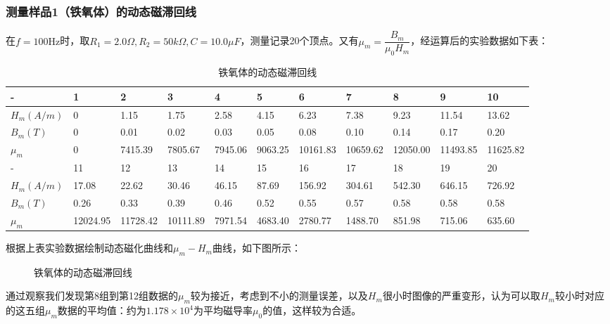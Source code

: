 \documentclass[11pt]{article}
\begin{document}
\subsubsection{测量样品1（铁氧体）的动态磁滞回线}

在$f=100\text{Hz}$时，取$R_1=2.0\Omega,R_2=50k\Omega,C=10.0\mu F$，测量记录20个顶点。又有$\mu_m = \dfrac{B_m}{\mu_0 H_m}$，经运算后的实验数据如下表：

\begin{table}[H]
    \begin{tabular}{|l|l|l|l|l|l|l|l|l|l|l|}
        \hline
        - & 1 & 2 & 3 & 4 & 5 & 6 & 7 & 8 & 9 & 10 \\ \hline
        $H_m(A/m)$ & 0  & 1.15  & 1.75  & 2.58  & 4.15  & 6.23  & 7.38  & 9.23  & 11.54  & 13.62 \\ \hline
        $B_m(T)$ & 0  & 0.01  & 0.02  & 0.03  & 0.05  & 0.08  & 0.10  & 0.14  & 0.17  & 0.20   \\ \hline
        $\mu_m$ & 0  & 7415.39  & 7805.67  & 7945.06  & 9063.25  & 10161.83  & 10659.62  & 12050.00  & 11493.85  & 11625.82   \\ \hline
        - & 11 & 12 & 13 & 14 & 15 & 16 & 17 & 18 & 19 & 20 \\ \hline
        $H_m(A/m)$ & 17.08  & 22.62  & 30.46  & 46.15  & 87.69  & 156.92  & 304.61  & 542.30  & 646.15  & 726.92   \\ \hline
        $B_m(T)$ & 0.26  & 0.33  & 0.39  & 0.46  & 0.52  & 0.55  & 0.57  & 0.58  & 0.58  & 0.58   \\ \hline
        $\mu_m$ & 12024.95  & 11728.42  & 10111.89  & 7971.54  & 4683.40  & 2780.77  & 1488.70  & 851.98  & 715.06  & 635.60 \\ \hline
    \end{tabular}
    \caption{铁氧体的动态磁滞回线}
\end{table}

根据上表实验数据绘制动态磁化曲线和$\mu_m - H_m$曲线，如下图所示：

\begin{figure}[H]
    \centering
    \hspace{0.02\textwidth}
    \hspace{0.02\textwidth}
    \caption{铁氧体的动态磁滞回线}
\end{figure}

通过观察我们发现第8组到第12组数据的$\mu_m$较为接近，考虑到不小的测量误差，以及$H_m$很小时图像的严重变形，认为可以取$H_m$较小时对应的这五组$\mu_m$数据的平均值：约为$1.178\times 10^4$为平均磁导率$\mu_0$的值，这样较为合适。
\end{document}
